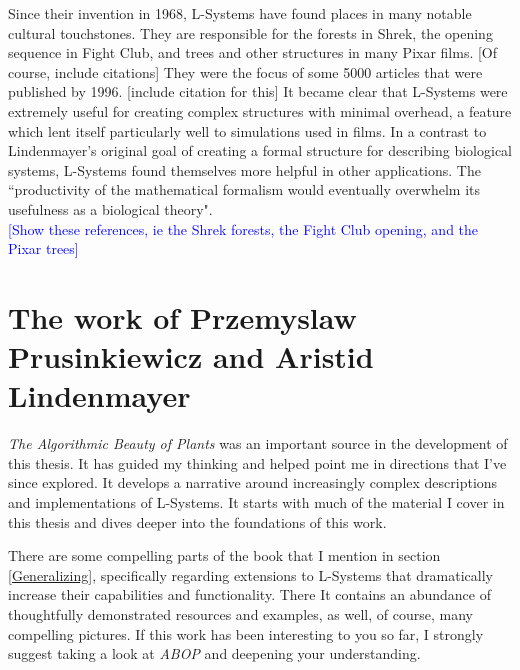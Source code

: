 \documentclass[12pt,twoside]{reedthesis}
\begin{document}
	Since their invention in 1968, L-Systems have found places in many notable cultural touchstones. They are responsible for the forests in Shrek, the opening sequence in Fight Club, and trees and other structures in many Pixar films. [Of course, include citations] They were the focus of some 5000 articles that were published by 1996. [include citation for this] It became clear that L-Systems were extremely useful for creating complex structures with minimal overhead, a feature which lent itself particularly well to simulations used in films. In a contrast to Lindenmayer's original goal of creating a formal structure for describing biological systems, L-Systems found themselves more helpful in other applications. The ``productivity of the mathematical formalism would eventually overwhelm its usefulness as a biological theory".\\
	
	\textcolor{blue}{[Show these references, ie the Shrek forests, the Fight Club opening, and the Pixar trees]}\\
	
	
	


\section{The work of Przemyslaw Prusinkiewicz and Aristid Lindenmayer}
	
	\textit{The Algorithmic Beauty of Plants} was an important source in the development of this thesis. It has guided my thinking and helped point me in directions that I've since explored. It develops a narrative around increasingly complex descriptions and implementations of L-Systems. It starts with much of the material I cover in this thesis and dives deeper into the foundations of this work.
	
	There are some compelling parts of the book that I mention in section \ref{Generalizing}, specifically regarding extensions to L-Systems that dramatically increase their capabilities and functionality. There It contains an abundance of thoughtfully demonstrated resources and examples, as well, of course, many compelling pictures. If this work has been interesting to you so far, I strongly suggest taking a look at \textit{ABOP} and deepening your understanding.\\
	
\end{document}
